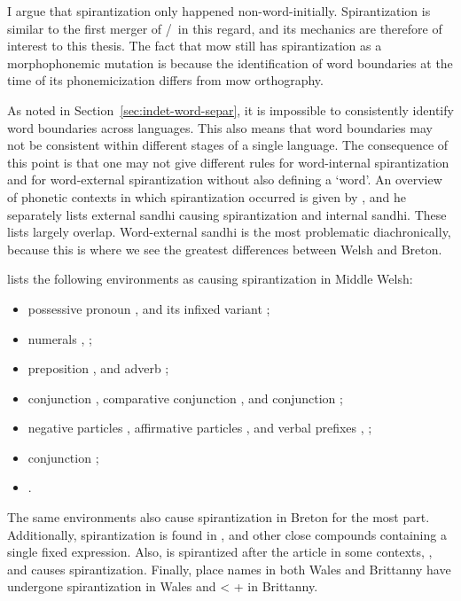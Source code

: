 I argue that spirantization only happened non-word-initially.
Spirantization is similar to the first merger of \lT/\xD\ in this regard, and its mechanics are therefore of interest to this thesis.
The fact that \gls{mow} still has spirantization as a morphophonemic mutation is because the identification of word boundaries at the time of its phonemicization differs from \gls{mow} orthography.

As noted in Section~\ref{sec:indet-word-separ}, it is impossible to consistently identify word boundaries across languages.
This also means that word boundaries may not be consistent within different stages of a single language.
The consequence of this point is that one may not give different rules for word-internal spirantization and for word-external spirantization without also defining a `word'.
An overview of phonetic contexts in which spirantization occurred is given by \textcite[2--3]{schrijver_spirantization_1999}, and he separately lists external sandhi causing spirantization and internal sandhi.
These lists largely overlap.
Word-external sandhi is the most problematic diachronically, because this is where we see the greatest differences between Welsh and Breton.


\Autocite[\S 24]{evans_grammar_1964} lists the following environments as causing spirantization in  Middle Welsh:
\begin{itemize}
\item possessive pronoun , and its infixed variant ;
\item numerals , ;
\item preposition , and adverb ;
\item conjunction , comparative conjunction , and conjunction ;
\item negative particles , affirmative particles , and verbal prefixes , \etc;
\item conjunction ;
\item {}.
\end{itemize}
The same environments also cause spirantization in Breton for the most part.
Additionally,  spirantization is found in , and other close compounds containing a single fixed expression.
Also,  is spirantized after the article in some contexts, \eg {}, and  causes spirantization.
Finally, place names in both Wales and Brittanny have undergone spirantization \eg {} in Wales and  <  +  in Brittanny.

